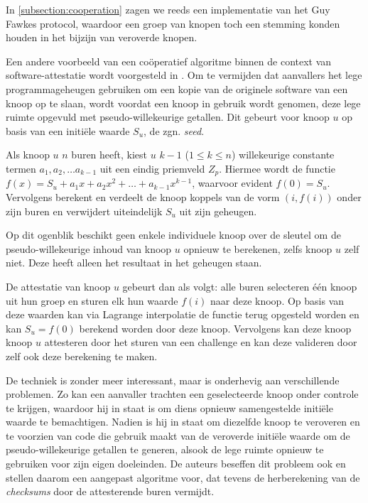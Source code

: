 In \ref{subsection:cooperation} zagen we reeds een implementatie van het Guy
Fawkes protocol, waardoor een groep van knopen toch een stemming konden houden
in het bijzijn van veroverde knopen.

Een andere voorbeeld van een co\"operatief algoritme binnen de context van
software-attestatie wordt voorgesteld in \citep{yang2007distributed}. Om te
vermijden dat aanvallers het lege programmageheugen gebruiken om een kopie van
de originele software van een knoop op te slaan, wordt voordat een knoop in
gebruik wordt genomen, deze lege ruimte opgevuld met pseudo-willekeurige
getallen. Dit gebeurt voor knoop $u$ op basis van een initi\"ele waarde $S_u$,
de zgn. \emph{seed}.

Als knoop $u$ $n$ buren heeft, kiest $u$ $k - 1$ ($1 \leq k \leq n$)
willekeurige constante termen $a_1, a_2,\dots a_{k-1}$ uit een eindig priemveld
$Z_p$. Hiermee wordt de functie $f(x) = S_u + a_1 x+a_2 x^2 +\dots + a_{k-1}
x^{k-1}$, waarvoor evident $f(0) = S_u$. Vervolgens berekent en verdeelt de
knoop koppels van de vorm $(i,f(i))$ onder zijn buren en verwijdert
uiteindelijk $S_u$ uit zijn geheugen.

Op dit ogenblik beschikt geen enkele individuele knoop over de sleutel om de
pseudo-willekeurige inhoud van knoop $u$ opnieuw te berekenen, zelfs knoop $u$
zelf niet. Deze heeft alleen het resultaat in het geheugen staan.

De attestatie van knoop $u$ gebeurt dan als volgt: alle buren selecteren
\'e\'en knoop uit hun groep en sturen elk hun waarde $f(i)$ naar deze knoop. Op
basis van deze waarden kan via Lagrange interpolatie de functie terug opgesteld
worden en kan $S_u = f(0)$ berekend worden door deze knoop. Vervolgens kan deze
knoop knoop $u$ attesteren door het sturen van een challenge en kan deze
valideren door zelf ook deze berekening te maken.

De techniek is zonder meer interessant, maar is onderhevig aan verschillende
problemen. Zo kan een aanvaller trachten een geselecteerde knoop onder controle
te krijgen, waardoor hij in staat is om diens opnieuw samengestelde initi\"ele
waarde te bemachtigen. Nadien is hij in staat om diezelfde knoop te veroveren
en te voorzien van code die gebruik maakt van de veroverde initi\"ele waarde om
de pseudo-willekeurige getallen te generen, alsook de lege ruimte opnieuw te
gebruiken voor zijn eigen doeleinden. De auteurs beseffen dit probleem ook en
stellen daarom een aangepast algoritme voor, dat tevens de herberekening van de
\emph{checksums} door de attesterende buren vermijdt.

